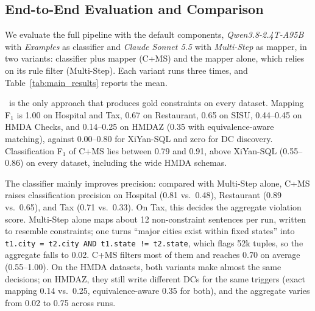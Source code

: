 \subsection{End-to-End Evaluation and Comparison}
\label{sec:endtoend}

We evaluate the full pipeline with the default components, \emph{Qwen3.8-2.4T-A95B} with \emph{Examples} as classifier and \emph{Claude Sonnet 5.5} with \emph{Multi-Step} as mapper, in two variants: classifier plus mapper (C+MS) and the mapper alone, which relies on its rule filter (Multi-Step). Each variant runs three times, and Table~\ref{tab:main_results} reports the mean. 

\begin{table}[!ht]
  \centering
  \caption{End-to-end comparison of \system\ (C+MS and Multi-Step; mean of three runs) and the baselines. \textbf{Profiling}: DC discovery from data alone; \textbf{Text2SQL}: XiYan-SQL adapted to generate violation queries; DNF, did not finish within the time and memory limits; n/a, metric not applicable; bold, best F$_1$ per metric and dataset.}
  \label{tab:main_results}
  \small
  \setlength{\tabcolsep}{4pt}
  \resizebox{\columnwidth}{!}{%
  
  }%

\end{table}

\system\ is the only approach that produces gold constraints on every dataset. Mapping F$_1$ is 1.00 on Hospital and Tax, 0.67 on Restaurant, 0.65 on SISU, 0.44--0.45 on HMDA Checks, and 0.14--0.25 on HMDAZ (0.35 with equivalence-aware matching), against 0.00--0.80 for XiYan-SQL and zero for DC discovery. Classification F$_1$ of C+MS lies between 0.79 and 0.91, above XiYan-SQL (0.55--0.86) on every dataset, including the wide HMDA schemas.

The classifier mainly improves precision: compared with Multi-Step alone, C+MS raises classification precision on Hospital (0.81 vs.\ 0.48), Restaurant (0.89 vs.\ 0.65), and Tax (0.71 vs.\ 0.33). On Tax, this decides the aggregate violation score. Multi-Step alone maps about 12 non-constraint sentences per run, written to resemble constraints; one turns ``major cities exist within fixed states'' into \texttt{t1.city = t2.city AND t1.state != t2.state}, which flags 52k tuples, so the aggregate falls to 0.02. C+MS filters most of them and reaches 0.70 on average (0.55--1.00). On the HMDA datasets, both variants make almost the same decisions; on HMDAZ, they still write different DCs for the same triggers (exact mapping 0.14 vs.\ 0.25, equivalence-aware 0.35 for both), and the aggregate varies from 0.02 to 0.75 across runs.

